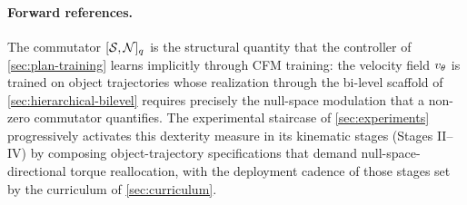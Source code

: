 \paragraph{Forward references.}
The commutator $[\mathcal{S}, \mathcal{N}]_{q}$ is the structural
quantity that the controller of \cref{sec:plan-training} learns
implicitly through CFM training: the velocity field
$v_{\theta}$ is trained on object trajectories whose realization
through the bi-level scaffold of
\cref{sec:hierarchical-bilevel} requires precisely the
null-space modulation that a non-zero commutator quantifies. The
experimental staircase of \cref{sec:experiments} progressively
activates this dexterity measure in its kinematic stages
(Stages II--IV) by composing object-trajectory specifications
that demand null-space-directional torque reallocation, with
the deployment cadence of those stages set by the curriculum
of \cref{sec:curriculum}.
